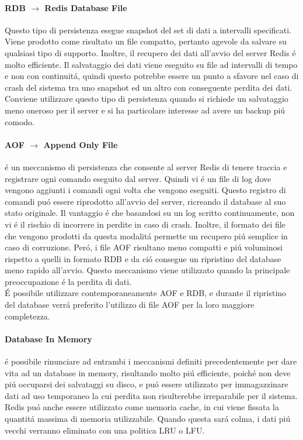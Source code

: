 \begin{itemize}
       \paragraph{RDB $\to$ Redis Database File}
         Questo tipo di persistenza esegue snapshot del set di dati a intervalli specificati. Viene prodotto come risultato un file
         compatto, pertanto agevole da salvare su qualsiasi tipo di supporto. Inoltre, il recupero dei dati all'avvio del server Redis
         é molto efficiente.
         Il salvataggio dei dati viene eseguito su file ad intervalli di tempo e non con continuitá, quindi questo potrebbe essere un punto a sfavore
         nel caso di crash del sistema tra uno snapshot ed un altro con conseguente perdita dei dati.
         Conviene utilizzare questo tipo di persistenza quando si richiede un salvataggio meno oneroso per il server e si ha particolare interesse
         ad avere un backup piú comodo.

    \paragraph{AOF $\to$ Append Only File}
    é un meccanismo di persistenza che consente al server Redis di tenere traccia e registrare ogni comando eseguito dal server.
    Quindi vi é un file di log dove vengono aggiunti i comandi ogni volta che vengono eseguiti.
    Questo registro di comandi puó essere riprodotto all'avvio del server, ricreando il database al suo stato originale.
    Il vantaggio é che basandosi su un log scritto continuamente, non vi é il rischio di incorrere in perdite in caso di crash. Inoltre,
    il formato dei file che vengono prodotti da questa modalitá permette un recupero piú semplice in caso di corruzione.
    Peró, i file AOF risultano meno compatti e piú voluminosi rispetto a quelli in formato RDB e da ció consegue un ripristino del database
    meno rapido all'avvio. Questo meccanismo viene utilizzato quando la principale preoccupazione é la perdita di dati.\\

    É possibile utilizzare contemporaneamente AOF e RDB, e durante il ripristino del database verrá preferito l'utilizzo di file AOF per la loro
    maggiore completezza.


    \paragraph{Database In Memory}
    é possibile rinunciare ad entrambi i meccanismi definiti precedentemente per dare vita ad un database in memory, risultando molto piú
    efficiente, poiché non deve piú occuparsi dei salvataggi su disco, e puó essere utilizzato per immagazzinare dati ad uso temporaneo la cui
    perdita non risulterebbe irreparabile per il sistema.\\
    Redis puó anche essere utilizzato come memoria cache, in cui viene fissata la quantitá massima di memoria utilizzabile. Quando questa sará
    colma, i dati piú vecchi verranno eliminato con una politica LRU o LFU.
\end{itemize}

